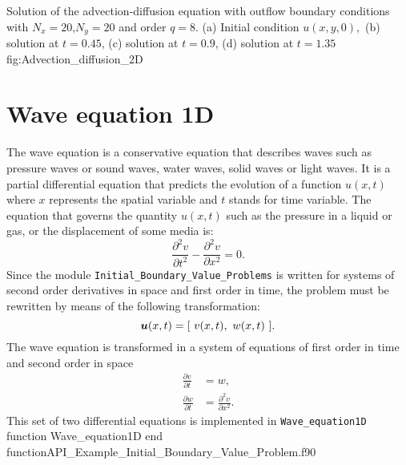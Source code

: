 \fourgraphs
{}
{}
{}
{}
{Solution of the advection-diffusion equation with outflow boundary conditions  with $ N_x =20$,$ N_y =20$  and order $q=8$. (a) Initial condition $u(x,y,0),$ (b) solution at $ t =0.45$, (c) solution at  $t=0.9$, (d) solution at $t=1.35$}{fig:Advection_diffusion_2D}
         
   

\newpage       
\section{Wave equation 1D}
The wave equation is a conservative equation that describes waves such as pressure waves or sound waves, water waves, solid waves or light waves. 
It is a partial differential equation that predicts the evolution of a  function $u(x, t)$ where $ x $ represents the spatial variable and  $ t $ stands for time variable. The equation that governs the quantity $u(x,t)$ such as the pressure in a liquid or gas, or the displacement of some media is: 
      \begin{equation*}      	
      \frac{\partial^2 v}{\partial t^2} -  \frac{\partial^2 v}{\partial x^2}  = 0.
      \end{equation*}
Since the module \verb|Initial_Boundary_Value_Problems| is written for systems of second order derivatives in space and first order in time, the problem must be rewritten by means of the following transformation: 
      $$
        \vect{u}(x, t) = [ \ v(x,t), \ w(x,t) \ ]. 
      $$
The wave equation is transformed in a system of equations of first order in time and second order in space     
      \begin{align*}  
      \frac{\partial v}{\partial t} & = w,  \\
      \frac{\partial w}{\partial t} & =  \frac{\partial^2 v}{\partial x^2}. 
      \end{align*}
This set of two differential equations is  implemented in \verb|Wave_equation1D|  
\vspace{0.5cm} 
     {function Wave_equation1D}
     {end function}{API_Example_Initial_Boundary_Value_Problem.f90}      
